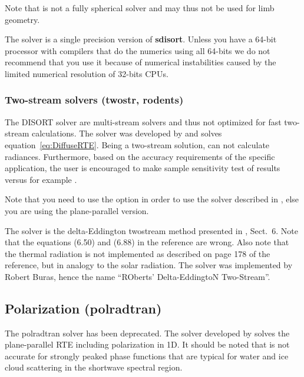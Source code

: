 Note that  is not a fully spherical solver and may thus
not be used for limb geometry.

The  solver is a single precision version of {\bf
  sdisort}. Unless you have a 64-bit processor with compilers that do
the numerics using all 64-bits we do not recommend that you use it
because of numerical instabilities caused by the limited numerical
resolution of 32-bits CPUs.



\subsubsection{Two-stream solvers (twostr, rodents)}
The DISORT solver are multi-stream solvers and thus not optimized for
fast two-stream calculations. The  solver was developed by
\citet{Kylling1995} and solves equation~\ref{eq:DiffuseRTE}. Being a
two-stream solution,  can not calculate
radiances. Furthermore, based on the accuracy requirements of the
specific application, the user is encouraged to make sample
sensitivity test of  results versus for example .

Note that you need to use the option  in order
to use the solver described in \citet{Kylling1995}, else you are using
the plane-parallel version.

The  solver is the delta-Eddington twostream method
presented in \cite{Zdunkowski2007}, Sect.~6. Note that the equations
(6.50) and (6.88) in the reference are wrong. Also note that the
thermal radiation is not implemented as described on page 178 of the
reference, but in analogy to the solar radiation. The solver was
implemented by Robert Buras, hence the name ``ROberts' Delta-EddingtoN
Two-Stream''.

\subsection{Polarization (polradtran)}
The polradtran solver has been deprecated.
The  solver developed by \citet{Evans1991} solves the
plane-parallel RTE including polarization in 1D. It should be
noted that  is not accurate for strongly peaked phase
functions that are typical for water and ice cloud scattering in the
shortwave spectral region. 

